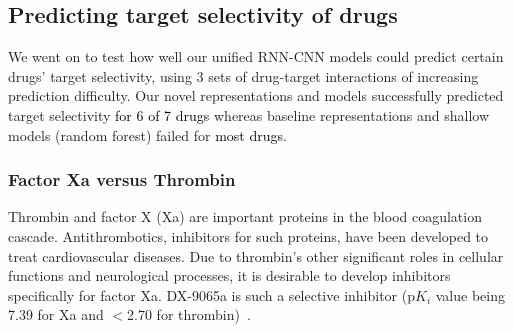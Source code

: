 \documentclass[nocrop]{bioinfo}
\newcommand{\red}[1]{\textcolor{black}{#1}}
\begin{document}
\vspace{-1em}
\subsection{Predicting target selectivity of drugs}
We went on to test how well our unified RNN-CNN models could predict certain drugs' target selectivity, using 3 sets of drug-target interactions of increasing prediction difficulty. Our novel representations and models successfully predicted target selectivity \red{for 6 of 7 drugs} whereas baseline representations and shallow models (random forest) failed for \red{most drugs}.  
 


\vspace{-1em}
\subsubsection{Factor Xa versus Thrombin}

Thrombin and factor X  (Xa) are important proteins in the blood coagulation cascade. Antithrombotics, inhibitors for such proteins, have been developed to treat cardiovascular diseases. Due to thrombin's other significant roles in cellular functions and neurological processes, it is desirable to develop inhibitors specifically for factor Xa.  DX-9065a is such a selective inhibitor  (p$K_i$ value being 7.39 for Xa and $<$2.70 for thrombin)~\citep{brandstetter1996x}. 
\end{document}
